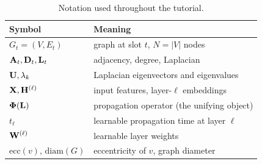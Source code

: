 \begin{table}[t]
\centering
\caption{Notation used throughout the tutorial.}
\label{tab:notation}
\renewcommand{\arraystretch}{1.15}
\begin{tabular}{@{}ll@{}}
\toprule
Symbol & Meaning \\
\midrule
$G_t=(V,E_t)$ & graph at slot $t$, $N=|V|$ nodes \\
$\mathbf{A}_t,\mathbf{D}_t,\mathbf{L}_t$ & adjacency, degree, Laplacian \\
$\mathbf{U},\lambda_k$ & Laplacian eigenvectors and eigenvalues \\
$\mathbf{X},\mathbf{H}^{(\ell)}$ & input features, layer-$\ell$ embeddings \\
$\boldsymbol{\Phi}(\mathbf{L})$ & propagation operator (the unifying object) \\
$t_\ell$ & learnable propagation time at layer $\ell$ \\
$\mathbf{W}^{(\ell)}$ & learnable layer weights \\
$\mathrm{ecc}(v),\,\mathrm{diam}(G)$ & eccentricity of $v$, graph diameter \\
\bottomrule
\end{tabular}
\end{table}

